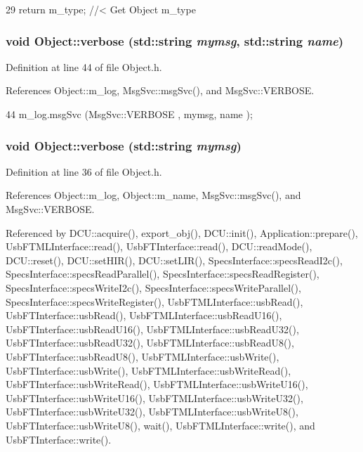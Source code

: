 \begin{DoxyCode}
29 { return m_type;       } //< Get Object m_type
\end{DoxyCode}
\hypertarget{classObject_a2d4120195317e2a3c6532e8bb9f3da68}{
\subsubsection[{verbose}]{\setlength{\rightskip}{0pt plus 5cm}void Object::verbose (std::string {\em mymsg}, \/  std::string {\em name})}}
\label{classObject_a2d4120195317e2a3c6532e8bb9f3da68}


Definition at line 44 of file Object.h.

References Object::m\_\-log, MsgSvc::msgSvc(), and MsgSvc::VERBOSE.


\begin{DoxyCode}
44 { m_log.msgSvc (MsgSvc::VERBOSE , mymsg, name ); }
\end{DoxyCode}
\hypertarget{classObject_a83d2db2df682907ea1115ad721c1c4a1}{
\subsubsection[{verbose}]{\setlength{\rightskip}{0pt plus 5cm}void Object::verbose (std::string {\em mymsg})}}
\label{classObject_a83d2db2df682907ea1115ad721c1c4a1}


Definition at line 36 of file Object.h.

References Object::m\_\-log, Object::m\_\-name, MsgSvc::msgSvc(), and MsgSvc::VERBOSE.

Referenced by DCU::acquire(), export\_\-obj(), DCU::init(), Application::prepare(), UsbFTMLInterface::read(), UsbFTInterface::read(), DCU::readMode(), DCU::reset(), DCU::setHIR(), DCU::setLIR(), SpecsInterface::specsReadI2c(), SpecsInterface::specsReadParallel(), SpecsInterface::specsReadRegister(), SpecsInterface::specsWriteI2c(), SpecsInterface::specsWriteParallel(), SpecsInterface::specsWriteRegister(), UsbFTMLInterface::usbRead(), UsbFTInterface::usbRead(), UsbFTMLInterface::usbReadU16(), UsbFTInterface::usbReadU16(), UsbFTMLInterface::usbReadU32(), UsbFTInterface::usbReadU32(), UsbFTMLInterface::usbReadU8(), UsbFTInterface::usbReadU8(), UsbFTMLInterface::usbWrite(), UsbFTInterface::usbWrite(), UsbFTMLInterface::usbWriteRead(), UsbFTInterface::usbWriteRead(), UsbFTMLInterface::usbWriteU16(), UsbFTInterface::usbWriteU16(), UsbFTMLInterface::usbWriteU32(), UsbFTInterface::usbWriteU32(), UsbFTMLInterface::usbWriteU8(), UsbFTInterface::usbWriteU8(), wait(), UsbFTMLInterface::write(), and UsbFTInterface::write().



